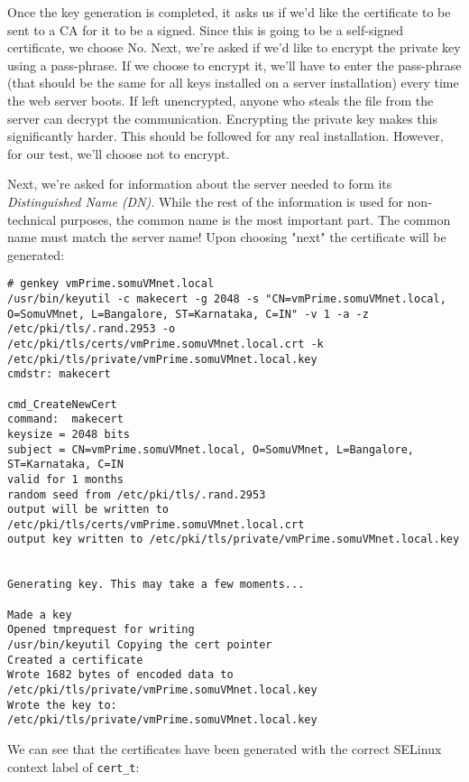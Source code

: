 Once the key generation is completed, it asks us if we'd like the certificate to be sent to a CA for it to be a signed. Since this is going to be a self-signed certificate, we choose No. Next, we're asked if we'd like to encrypt the private key using a pass-phrase. If we choose to encrypt it, we'll have to enter the pass-phrase (that should be the same for all keys installed on a server installation) every time the web server boots. If left unencrypted, anyone who steals the file from the server can decrypt the communication. Encrypting the private key makes this significantly harder. This should be followed for any real installation. However, for our test, we'll choose not to encrypt. 

Next, we're asked for information about the server needed to form its \textit{Distinguished Name (DN)}. While the rest of the information is used for non-technical purposes, the common name is the most important part. The common name must match the server name! Upon choosing "next" the certificate will be generated:

\vspace{-15pt}
\begin{verbatim}
# genkey vmPrime.somuVMnet.local
/usr/bin/keyutil -c makecert -g 2048 -s "CN=vmPrime.somuVMnet.local, O=SomuVMnet, L=Bangalore, ST=Karnataka, C=IN" -v 1 -a -z /etc/pki/tls/.rand.2953 -o /etc/pki/tls/certs/vmPrime.somuVMnet.local.crt -k /etc/pki/tls/private/vmPrime.somuVMnet.local.key
cmdstr: makecert

cmd_CreateNewCert
command:  makecert
keysize = 2048 bits
subject = CN=vmPrime.somuVMnet.local, O=SomuVMnet, L=Bangalore, ST=Karnataka, C=IN
valid for 1 months
random seed from /etc/pki/tls/.rand.2953
output will be written to /etc/pki/tls/certs/vmPrime.somuVMnet.local.crt
output key written to /etc/pki/tls/private/vmPrime.somuVMnet.local.key


Generating key. This may take a few moments...

Made a key
Opened tmprequest for writing
/usr/bin/keyutil Copying the cert pointer
Created a certificate
Wrote 1682 bytes of encoded data to /etc/pki/tls/private/vmPrime.somuVMnet.local.key 
Wrote the key to:
/etc/pki/tls/private/vmPrime.somuVMnet.local.key
\end{verbatim}
\vspace{-10pt}	

\noindent
We can see that the certificates have been generated with the correct SELinux context label of \verb|cert_t|:

